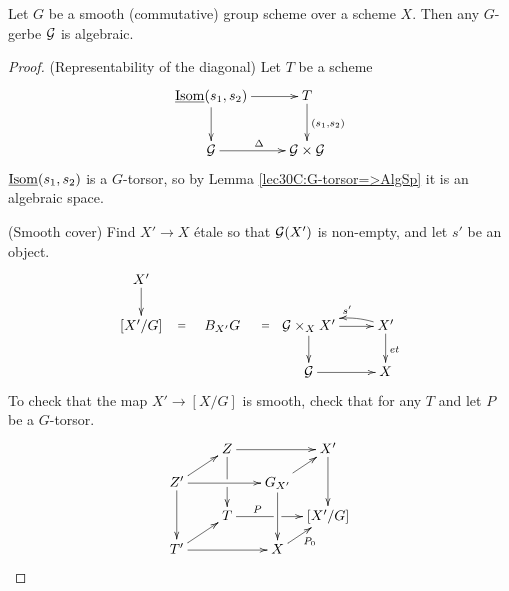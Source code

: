 \begin{proposition}
 Let $G$ be a smooth (commutative) group scheme over a scheme $X$. Then any $G$-gerbe $\mathcal{G}$  is algebraic.
\end{proposition}
\begin{proof}
 (Representability of the diagonal) Let $T$ be a scheme
 \[\xymatrix{
  \isom(s_1,s_2)\ar[r]\ar[d]& T\ar[d]^{(s_1,s_2)}\\
  \G\ar[r]^\Delta & \G\times \G
 }\]
 $\operatorname{\underline{Isom}}(s_1,s_2)$ is a $G$-torsor, so by Lemma \ref{lec30C:G-torsor=>AlgSp} it is an algebraic space.

 (Smooth cover) Find $X'\to X$ \'etale so that $\mathcal{G}(X')$ is non-empty, and let $s'$ be an object.
 \[\xymatrix@R-.5pc{
  X'\ar[d]\\
  [X'/G]\ar@{}[r]|{=}& B_{X'}G\ar@{}[r]|{=} &\G\times_X X' \ar[r]\ar[d] & X'\ar[d]^{et} \ar@/_/[l]_{s'}\\
  & & \G\ar[r] & X
 }\]
 To check that the map $X'\to [X/G]$ is smooth, check that for any $T$ and let $P$ be a $G$-torsor.
 \[
 \xymatrix @!0 @C+1pc{
  & Z\ar[rr]\ar[dd]|\hole& & X'\ar[dd]\\
  Z'\ar[rr]\ar[dd]\ar[ur] & & G_{X'}\ar[dd]\ar[ur]\\
  & T\ar[rr]|\hole^(.3){P} & & [X'/G]\\
  T'\ar[rr]\ar[ur] & & X \ar[ur]_{P_0}
 }\]
\end{proof}
